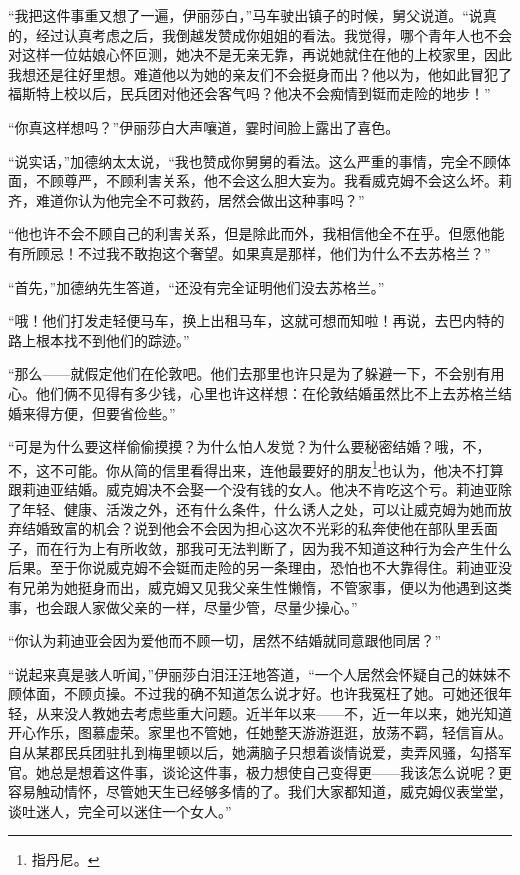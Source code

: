 \par “我把这件事重又想了一遍，伊丽莎白，”马车驶出镇子的时候，舅父说道。“说真的，经过认真考虑之后，我倒越发赞成你姐姐的看法。我觉得，哪个青年人也不会对这样一位姑娘心怀叵测，她决不是无亲无靠，再说她就住在他的上校家里，因此我想还是往好里想。难道他以为她的亲友们不会挺身而出？他以为，他如此冒犯了福斯特上校以后，民兵团对他还会客气吗？他决不会痴情到铤而走险的地步！”
\par “你真这样想吗？”伊丽莎白大声嚷道，霎时间脸上露出了喜色。
\par “说实话，”加德纳太太说，“我也赞成你舅舅的看法。这么严重的事情，完全不顾体面，不顾尊严，不顾利害关系，他不会这么胆大妄为。我看威克姆不会这么坏。莉齐，难道你认为他完全不可救药，居然会做出这种事吗？”
\par “他也许不会不顾自己的利害关系，但是除此而外，我相信他全不在乎。但愿他能有所顾忌！不过我不敢抱这个奢望。如果真是那样，他们为什么不去苏格兰？”
\par “首先，”加德纳先生答道，“还没有完全证明他们没去苏格兰。”
\par “哦！他们打发走轻便马车，换上出租马车，这就可想而知啦！再说，去巴内特的路上根本找不到他们的踪迹。”
\par “那么——就假定他们在伦敦吧。他们去那里也许只是为了躲避一下，不会别有用心。他们俩不见得有多少钱，心里也许这样想：在伦敦结婚虽然比不上去苏格兰结婚来得方便，但要省俭些。”
\par “可是为什么要这样偷偷摸摸？为什么怕人发觉？为什么要秘密结婚？哦，不，不，这不可能。你从简的信里看得出来，连他最要好的朋友\footnote{指丹尼。}也认为，他决不打算跟莉迪亚结婚。威克姆决不会娶一个没有钱的女人。他决不肯吃这个亏。莉迪亚除了年轻、健康、活泼之外，还有什么条件，什么诱人之处，可以让威克姆为她而放弃结婚致富的机会？说到他会不会因为担心这次不光彩的私奔使他在部队里丢面子，而在行为上有所收敛，那我可无法判断了，因为我不知道这种行为会产生什么后果。至于你说威克姆不会铤而走险的另一条理由，恐怕也不大靠得住。莉迪亚没有兄弟为她挺身而出，威克姆又见我父亲生性懒惰，不管家事，便以为他遇到这类事，也会跟人家做父亲的一样，尽量少管，尽量少操心。”
\par “你认为莉迪亚会因为爱他而不顾一切，居然不结婚就同意跟他同居？”
\par “说起来真是骇人听闻，”伊丽莎白泪汪汪地答道，“一个人居然会怀疑自己的妹妹不顾体面，不顾贞操。不过我的确不知道怎么说才好。也许我冤枉了她。可她还很年轻，从来没人教她去考虑些重大问题。近半年以来——不，近一年以来，她光知道开心作乐，图慕虚荣。家里也不管她，任她整天游游逛逛，放荡不羁，轻信盲从。自从某郡民兵团驻扎到梅里顿以后，她满脑子只想着谈情说爱，卖弄风骚，勾搭军官。她总是想着这件事，谈论这件事，极力想使自己变得更——我该怎么说呢？更容易触动情怀，尽管她天生已经够多情的了。我们大家都知道，威克姆仪表堂堂，谈吐迷人，完全可以迷住一个女人。”
